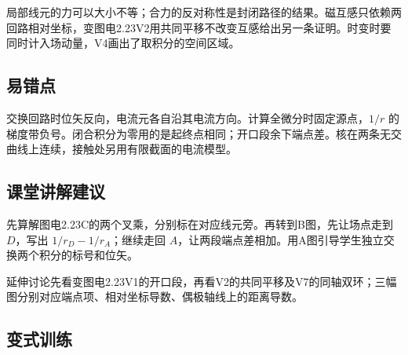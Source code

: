 \documentclass[UTF8,fontset=fandol,a4paper,11pt]{ctexart}
\begin{document}
局部线元的力可以大小不等；合力的反对称性是封闭路径的结果。磁互感只依赖两回路相对坐标，变图电2.23V2用共同平移不改变互感给出另一条证明。时变时要同时计入场动量，V4画出了取积分的空间区域。



\subsection*{易错点}

交换回路时位矢反向，电流元各自沿其电流方向。计算全微分时固定源点，$1/r$ 的梯度带负号。闭合积分为零用的是起终点相同；开口段余下端点差。核在两条无交曲线上连续，接触处另用有限截面的电流模型。



\subsection*{课堂讲解建议}

先算解图电2.23C的两个叉乘，分别标在对应线元旁。再转到B图，先让场点走到 $D$，写出 $1/r_D-1/r_A$；继续走回 $A$，让两段端点差相加。用A图引导学生独立交换两个积分的标号和位矢。

延伸讨论先看变图电2.23V1的开口段，再看V2的共同平移及V7的同轴双环；三幅图分别对应端点项、相对坐标导数、偶极轴线上的距离导数。


\subsection*{变式训练}
\end{document}
